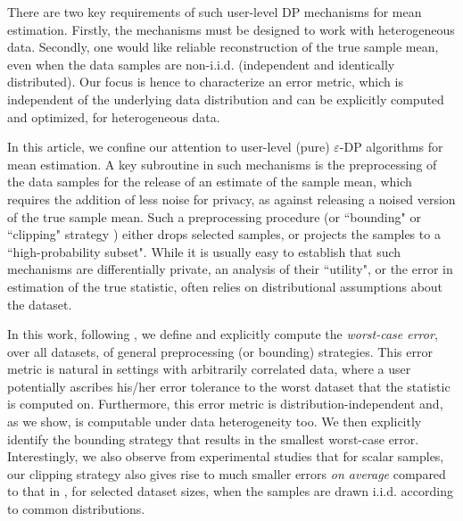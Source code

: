 \documentclass[conference,letterpaper]{IEEEtran}
\theoremstyle{remark}
\theoremstyle{definition}
\begin{document}
There are two key requirements of such user-level DP mechanisms for mean estimation. Firstly, the mechanisms must be designed to work with heterogeneous data. Secondly, one would like reliable reconstruction of the true sample mean, even when the data samples are non-i.i.d. (independent and identically distributed). Our focus is hence to  characterize an error metric, which is independent of the underlying data distribution and can be explicitly computed and optimized, for heterogeneous data.


In this article, we confine our attention to user-level (pure) $\varepsilon$-DP algorithms for mean estimation. A key subroutine in such mechanisms \cite{userlevel,hetero-user-level,hist-user-level,amin} is the preprocessing of the data samples for the release of an estimate of the sample mean, which requires the addition of less noise for privacy, as against releasing a noised version of the true sample mean. Such a preprocessing procedure (or ``bounding" or ``clipping" strategy \cite{amin}) either drops selected samples, or projects the samples to a ``high-probability subset". While it is usually easy to establish that such mechanisms are differentially private, an analysis of their ``utility", or the error in estimation of the true statistic, often relies on distributional assumptions about the dataset. 

In this work, following \cite{dp_spcom,dp_preprint,tit-preprint}, we define and explicitly compute the \emph{worst-case error}, over all datasets, of general preprocessing (or bounding) strategies. This error metric is natural in settings with arbitrarily correlated data, where a user potentially ascribes his/her error tolerance to the worst dataset that the statistic is computed on. Furthermore, this error metric is distribution-independent and, as we show, is computable under data heterogeneity too. We then explicitly identify the bounding strategy that results in the smallest worst-case error. Interestingly, we also observe from experimental studies that for scalar samples, our clipping strategy also gives rise to much smaller errors \emph{on average} compared to that in \cite{amin}, for selected dataset sizes, when the samples are drawn i.i.d. according to common distributions.
\end{document}
